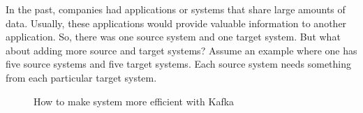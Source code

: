 In the past, companies had applications or systems that share large amounts of data.
Usually, these applications would provide valuable information to another application.
So, there was one source system and one target system.
But what about adding more source and target systems?
Assume an example where one has five source systems and five target systems.
Each source system needs something from each particular target system.
\begin{figure}[ht!]
    \hspace{0.01\textwidth}
    \hspace{0.01\textwidth}
    \hspace{0.01\textwidth}
    \caption{How to make system more efficient with Kafka}
    \label{fig:withoutAndWithBroker}
\end{figure}

